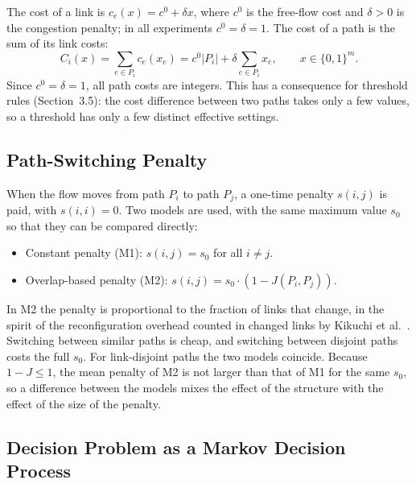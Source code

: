 \documentclass{amsart}
\newcommand{\abs}[1]{\left\lvert #1 \right\rvert}
\begin{document}
The cost of a link is $c_e(x) = c^0 + \delta x$, where $c^0$ is the free-flow cost and $\delta > 0$ is the congestion penalty; in all experiments $c^0 = \delta = 1$. The cost of a path is the sum of its link costs:
\begin{equation}
  C_i(x) = \sum_{e \in P_i} c_e(x_e) = c^0 \abs{P_i} + \delta \sum_{e \in P_i} x_e, \qquad x \in \{0,1\}^m.
  \label{eq:pathcost}
\end{equation}
Since $c^0 = \delta = 1$, all path costs are integers. This has a consequence for threshold rules (Section~3.5): the cost difference between two paths takes only a few values, so a threshold has only a few distinct effective settings.

\subsection{Path-Switching Penalty}

When the flow moves from path $P_i$ to path $P_j$, a one-time penalty $s(i,j)$ is paid, with $s(i,i) = 0$. Two models are used, with the same maximum value $s_0$ so that they can be compared directly:
\begin{itemize}
  \item Constant penalty (M1): $s(i,j) = s_0$ for all $i \neq j$.
  \item Overlap-based penalty (M2): $s(i,j) = s_0 \cdot (1 - J(P_i, P_j))$.
\end{itemize}
In M2 the penalty is proportional to the fraction of links that change, in the spirit of the reconfiguration overhead counted in changed links by Kikuchi et al.\ \cite{kikuchi2025}. Switching between similar paths is cheap, and switching between disjoint paths costs the full $s_0$. For link-disjoint paths the two models coincide. Because $1 - J \le 1$, the mean penalty of M2 is not larger than that of M1 for the same $s_0$, so a difference between the models mixes the effect of the structure with the effect of the size of the penalty.

\subsection{Decision Problem as a Markov Decision Process}
\end{document}
